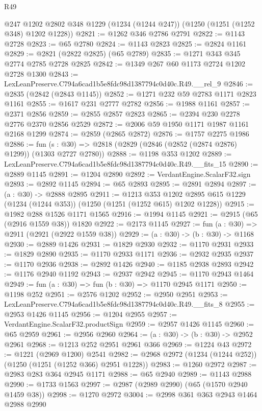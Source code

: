 \begin{lexlean}{R49}
\begin{coremodule}
    @247
    @1202
    @2802
    @348
    @1229
    (@1234 (@1244 @247))
    (@1250 (@1251 (@1252 @348) @1202 @1228))
@2821 := @1262 @346 @2786 @2791
@2822 := @1143 @2728
@2823 := @65 @2780
@2824 := @1143 @2823
@2825 := @2824 @1161
@2829 := @2821 (@2822 @2825) (@65 @2789)
@2835 := @1271 @343 @345 @2774 @2785 @2728 @2825
@2842 := @1349 @267 @60 @1173 @2724 @1202 @2728 @1300
@2843 := LexLeanPreserve.C794a6cad1b5e8fdc98d1387794c0d40c.R49.__rel_9
@2846 := @2835 (@2842 (@2843 @1145))
@2852 := @1271 @232 @59 @2783 @1171 @2823 @1161
@2855 := @1617 @231 @2777 @2782
@2856 := @1988 @1161
@2857 := @2371 @2856
@2859 := @2855 @2857 @2823
@2865 := @2394 @230 @2278 @2776 @2370 @2856 @2529
@2872 := @2006 @59 @1950 @1171 @1987 @1161 @2168 @1299
@2874 := @2859 (@2865 @2872)
@2876 := @1757 @2275 @1986
@2886 := fun (s : @30) => @2818 (@2829 (@2846 (@2852 (@2874 @2876) @1299)) (@1303 @2727 @2780))
@2888 := @1198 @353 @1202
@2889 := LexLeanPreserve.C794a6cad1b5e8fdc98d1387794c0d40c.R49.__fits_15
@2890 := @2889 @1145
@2891 := @1204 @2890
@2892 := VerdantEngine.ScalarF32.sign
@2893 := @2892 @1145
@2894 := @65 @2893
@2895 := @2891 @2894
@2897 := (a : @30) -> @2888 @2895
@2911 := @1213
    @353
    @1202
    @2895
    @615
    @1229
    (@1234 (@1244 @353))
    (@1250 (@1251 (@1252 @615) @1202 @1228))
@2915 := @1982 @288 @1526 @1171 @1565
@2916 := @1994 @1145
@2921 := @2915 (@65 (@2916 @1559 @38)) @1820
@2922 := @2173 @1145
@2927 := fun (a : @30) => @2911 (@2921 (@2922 @1559 @38))
@2929 := (a : @30) -> (b : @30) -> @1168
@2930 := @2889 @1426
@2931 := @1829 @2930
@2932 := @1170 @2931
@2933 := @1829 @2890
@2935 := @1170 @2933 @1171
@2936 := @2932 @2935
@2937 := @1170 @2936
@2938 := @2892 @1426
@2940 := @1185 @2938 @2893
@2942 := @1176 @2940 @1192
@2943 := @2937 @2942
@2945 := @1170 @2943 @1464
@2949 := fun (a : @30) => fun (b : @30) => @1170 @2945 @1171
@2950 := @1198 @252
@2951 := @2576 @1202
@2952 := @2950 @2951
@2953 := LexLeanPreserve.C794a6cad1b5e8fdc98d1387794c0d40c.R49.__fits_8
@2955 := @2953 @1426 @1145
@2956 := @1204 @2955
@2957 := VerdantEngine.ScalarF32.productSign
@2959 := @2957 @1426 @1145
@2960 := @65 @2959
@2961 := @2956 @2960
@2964 := (a : @30) -> (b : @30) -> @2952 @2961
@2968 := @1213 @252 @2951 @2961 @366
@2969 := @1224 @43
@2972 := @1221 (@2969 @1200) @2541
@2982 := @2968 @2972 (@1234 (@1244 @252)) (@1250 (@1251 (@1252 @366) @2951 @1228))
@2983 := @1260 @2972
@2987 := @2983 @283 @364 @2945 @1171
@2988 := @65 @2940
@2989 := @1143 @2988
@2990 := @1733 @1563
@2997 := @2987 (@2989 @2990) (@65 (@1570 @2940 @1459 @38))
@2998 := @1270 @2972
@3004 := @2998 @361 @363 @2943 @1464 @2988 @2990

\end{coremodule}
\end{lexlean}

